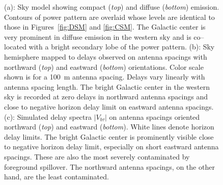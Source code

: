 \documentclass[preprint2,iop,numberedappendix]{emulateapj}
\begin{document}
\begin{figure}[htb]
\centering
\caption{(a): Sky model showing compact ({\it top}) and diffuse ({\it bottom}) emission. Contours of power pattern are overlaid whose levels are identical to those in Figures~\ref{fig:DSM} and \ref{fig:CSM}. The Galactic center is very prominent in diffuse emission in the western sky and is co--located with a bright secondary lobe of the power pattern. (b): Sky hemisphere mapped to delays observed on antenna spacings with northward ({\it top}) and eastward ({\it bottom}) orientations. Color scale shown is for a 100~m antenna spacing. Delays vary linearly with antenna spacing length. The bright Galactic center in the western sky is recorded at zero delays in northward antenna spacings and close to negative horizon delay limit on eastward antenna spacings. (c): Simulated delay spectra $|V_{b\tau}|$ on antenna spacings oriented northward ({\it top}) and eastward ({\it bottom}). White lines denote horizon delay limits. The bright Galactic center is prominently visible close to negative horizon delay limit, especially on short eastward antenna spacings. These are also the most severely contaminated by foreground spillover. The northward antenna spacings, on the other hand, are the least contaminated.}

\end{figure}
\end{document}
